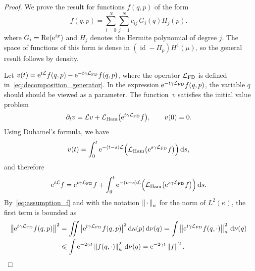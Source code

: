 \documentclass[11pt,a4paper]{article}
\DeclareMathOperator{\id}{id}
\newcommand{\e}{\mathrm{e}}
\newcommand{\dummy}{\,\cdot\,}
\renewcommand{\d}{\mathrm d}
\theoremstyle{plain}
\numberwithin{equation}{section}
\renewcommand{\leq}{\leqslant}
\begin{document}
\begin{proof}
    We prove the result for functions $f(q, p)$ of the form
    \begin{equation}
        \label{eq:expansion}
        f(q, p) = \sum_{i=0}^{N} \sum_{j=1}^{N} c_{ij} \, G_i(q) H_j(p).
    \end{equation}
    where $G_i = {\rm Re}(\e^{ix})$ and $H_j$ denotes the Hermite polynomial of degree $j$.
    The space of functions of this form is dense in $(\id - \Pi_p) H^1(\mu)$,
    so the general result follows by density.

    Let $v(t) = \e^{t \mathcal L} f(q, p) - \e^{- t \gamma \mathcal L_{\rm FD}} f(q, p)$,
    where the operator $\mathcal L_{\rm FD}$ is defined in~\eqref{eq:decomposition_generator}.
    In the expression $\e^{- t \gamma \mathcal L_{\rm FD}} f(q, p)$,
    the variable $q$ should should be viewed as a parameter.
    The function~$v$ satisfies the initial value problem
    \[
        \partial_t v = \mathcal L v +  \mathcal L_{\rm Ham} \bigl(\e^{t \gamma \mathcal L_{\rm FD}} f\bigr), \qquad v(0) = 0.
    \]
    Using Duhamel's formula, we have
    \[
        v(t) = \int_{0}^{t} \e^{- (t-s) \mathcal L}  \Bigl( \mathcal L_{\rm Ham} \bigl(\e^{s \gamma \mathcal L_{\rm FD}} f\bigr) \Bigr) \, \d s,
    \]
    and therefore
    \begin{equation}
        \label{eq:intermediate_decay_correlation}
        \e^{t \mathcal L} f =  \e^{t \gamma \mathcal L_{\rm FD}} f
        + \int_{0}^{t} \e^{- (t-s) \mathcal L}  \Bigl( \mathcal L_{\rm Ham} \bigl(\e^{s \gamma \mathcal L_{\rm FD}} f\bigr) \Bigr) \, \d s.
    \end{equation}
    By~\eqref{eq:assumption_f} and with the notation $\norm{\dummy}[\kappa]$ for the norm of $L^2(\kappa)$,
    the first term is bounded as
    \begin{align}
        \notag
        \norm{\e^{t \gamma \mathcal L_{\rm FD}} f(q, p)}^2
        &= \int \!\!\!\! \int  \abs{\e^{t \gamma \mathcal L_{\rm FD}} f(q, p) }^2 \d \kappa(p) \,\d \nu(q)
        = \int \norm{\e^{t \gamma \mathcal L_{\rm FD}} f(q, \cdot) }[\kappa]^2 \, \d \nu(q) \\
        \label{eq:bound_first_term}
        &\leq \int \e^{-2 \gamma t} \norm{f(q, \cdot) }[\kappa]^2 \, \d \nu(q) = \e^{-2\gamma t} \norm{f}^2.

\end{align}
\end{proof}
\end{document}
